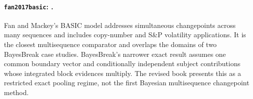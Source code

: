 
\paragraph{\texttt{fan2017basic}: \citet{fan2017basic}.}
Fan and Mackey's BASIC model addresses simultaneous changepoints across many sequences and includes copy-number and S\&P volatility applications. It is the closest multisequence comparator and overlaps the domains of two BayesBreak case studies. BayesBreak's narrower exact result assumes one common boundary vector and conditionally independent subject contributions whose integrated block evidences multiply. The revised book presents this as a restricted exact pooling regime, not the first Bayesian multisequence changepoint method.
